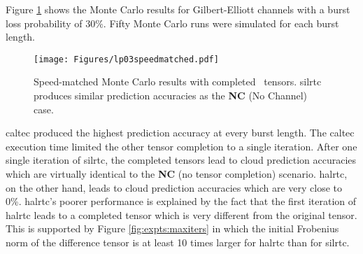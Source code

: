 Figure \ref{fig:expts:speed} shows the Monte Carlo results for Gilbert-Elliott channels with a burst loss probability of $30\%$. Fifty Monte Carlo runs were simulated for each burst length. 

\begin{figure}[H]
	\centering
	\texttt{[image: Figures/lp03speedmatched.pdf]}
	\caption[Speed-matched Monte Carlo results with completed ResNet18 tensors]{Speed-matched Monte Carlo results with completed \addone~tensors. \gls{silrtc} produces similar prediction accuracies as the \textbf{NC} (No Channel) case.}
	\label{fig:expts:speed}
\end{figure}

\gls{caltec} produced the highest prediction accuracy at every burst length. The \gls{caltec} execution time limited the other tensor completion to a single iteration. After one single iteration of \gls{silrtc}, the completed tensors lead to cloud prediction accuracies which are virtually identical to the \textbf{NC} (no tensor completion) scenario. \gls{halrtc}, on the other hand, leads to cloud prediction accuracies which are very close to 0\%. \gls{halrtc}'s poorer performance is explained by the fact that the first iteration of \gls{halrtc} leads to a completed tensor which is very different from the original tensor. This is supported by Figure \ref{fig:expts:maxiters} in which the initial Frobenius norm of the difference tensor is at least 10 times larger for \gls{halrtc} than for \gls{silrtc}.

